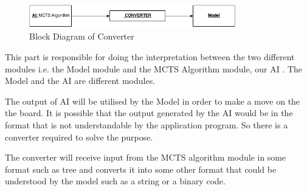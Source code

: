 \begin{figure}[H]
	\centering
	\includegraphics[width=0.80\textwidth]{2General_Architecture/2.2API/img/CONVERTER.png}
	\caption{Block Diagram of Converter}
	\label{fig:flowchart}
\end{figure}

This part is responsible for doing the interpretation between the two different modules i.e. the Model module and the MCTS Algorithm module, our AI . The Model and the AI are different modules. 

The output of AI will be utilised by the Model in order to make a move on the the board. It is possible that the output generated by the AI would be in the format that is not understandable by the application program. So there is a converter required to solve the purpose.

The converter will receive input from the MCTS algorithm module in some format such as tree and converts it into some other format that could be understood by the model such as a string or a binary code.

